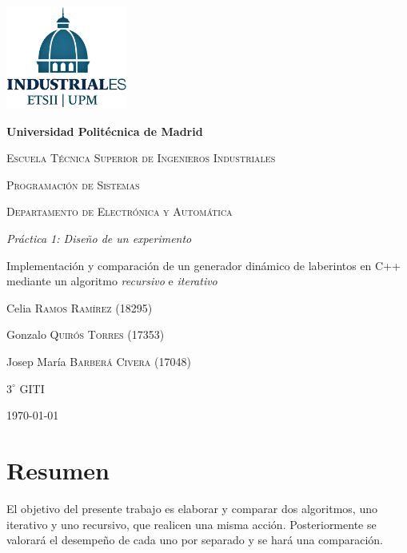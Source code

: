 \documentclass[12pt,a4paper]{article}
\newcommand{\grad}{^{\circ}}
\begin{document}
	\begin{titlepage}
	\centering
    {\includegraphics[width=0.3\textwidth]{fotos/Logo_azul.png}\par}
	\vspace{1cm}
	{\bfseries\LARGE Universidad Politécnica de Madrid \par}
	\vspace{1cm}
	{\scshape\Large Escuela Técnica Superior de Ingenieros Industriales \par}
	\vspace{2.5cm}
	{\scshape\Huge Programación de Sistemas \par}
	\vspace{0.5cm}
	{\scshape\large Departamento de Electrónica y Automática \par}
	\vspace{2cm}
    {\itshape\LARGE Práctica 1: Diseño de un experimento \par}
    \vspace{0.5cm}
    {\upshape\large Implementación y comparación de un generador dinámico de laberintos en C++ mediante un algoritmo \textit{recursivo} e \textit{iterativo}}
	\vfill
	{\large{Celia \textsc{Ramos Ramírez} (18295)\par}}
	\vspace{0.1cm}
    {\large{Gonzalo \textsc{Quirós Torres} (17353)\par}}
	\vspace{0.1cm}
	{\large{Josep María \textsc{Barberá Civera} (17048)\par}}
	\vfill
	{\Large{ $3\grad$ \textsc{GITI}}\par}
	\vfill
	{\Large \today \par}
	\end{titlepage}
	

\section*{Resumen}
El objetivo del presente trabajo es elaborar y comparar dos algoritmos, uno iterativo y uno recursivo, que realicen una misma acción. Posteriormente se valorará el desempeño de cada uno por separado y se hará una comparación. 
\end{document}
